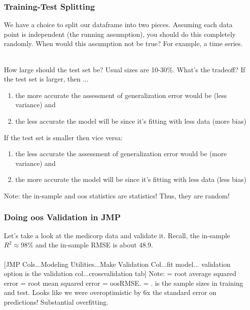 \documentclass[handout]{beamer}
\begin{document}
\begin{frame}\frametitle{Training-Test Splitting}
\footnotesize
We have a choice to split our dataframe into two pieces. Assuming each data point is independent (the running assumption), you should do this completely randomly. When would this assumption not be true? \pause For example, a time series.\\~\\ \pause
\vspace{-0.2cm}

How large should the test set be? Usual sizes are 10-30\%. What's the tradeoff? If the test set is larger, then ...\pause
 
\begin{enumerate}\footnotesize
\item the more accurate the assessment of generalization error would be (less variance) and \pause
\item the less accurate the model will be since it's fitting with less data (more bias) \pause
\end{enumerate}

If the test set is smaller then vice versa:

\begin{enumerate}\footnotesize
\item the less accurate the assessment of generalization error would be (more variance) and \pause
\item the more accurate the model will be since it's fitting with less data (less bias) \pause
\end{enumerate}

Note: the in-sample and oos statistics are statistics! Thus, they are random!

\end{frame}

\begin{frame}\frametitle{Doing oos Validation in JMP}

Let's take a look at the medicorp data and validate it. Recall, the in-sample $R^2 \approx 98\%$ and the in-sample RMSE is about 48.9. \pause \\~\\

[JMP Cols...Modeling Utilities...Make Validation Col...fit model... validation option is the validation col...crossvalidation tab] Note:  = root average squared error = root mean squared error = oosRMSE.  = .  is the sample sizes in training and test. Looks like we were overoptimistic by 6x the standard error on predictions! Substantial overfitting.

\end{frame}
\end{document}
